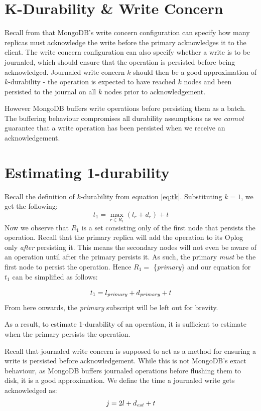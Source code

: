 \section{K-Durability \& Write Concern}
Recall from  that MongoDB's write concern configuration can specify how many replicas must acknowledge the write before the primary acknowledges it to the client. The write concern configuration can also specify whether a write is to be journaled, which should ensure that the operation is persisted before being acknowledged. Journaled write concern $k$ should then be a good approximation of $k$-durability - the operation is expected to have reached $k$ nodes and been persisted to the journal on all $k$ nodes prior to acknowledgement. 

However MongoDB buffers write operations before persisting them as a batch. The buffering behaviour compromises all durability assumptions as we \textit{cannot} guarantee that a write operation has been persisted when we receive an acknowledgement. 

\section{Estimating 1-durability}
Recall the definition of $k$-durability from equation \ref{eq:tk}. Substituting $k = 1$, we get the following:
\[
    t_1 = \max_{r \in R_1}(l_r + d_r) + t
\]
Now we observe that $R_1$ is a set consisting only of the first node that persists the operation. Recall that the primary replica will add the operation to its Oplog only \textit{after} persisting it. This means the secondary nodes will not even be aware of an operation until after the primary persists it. As such, the primary \textit{must} be the first node to persist the operation. Hence $R_1 = $ \{\textit{primary}\} and our equation for $t_1$ can be simplified as follows:
\begin{center}
\begin{equation} \label{eq:t1}
    t_1 = l_{\text{\textit{primary}}}+ d_{\text{\textit{primary}}} + t
\end{equation}
From here onwards, the \textit{primary} subscript will be left out for brevity.
\end{center}

As a result, to estimate 1-durability of an operation, it is sufficient to estimate when the primary persists the operation.

Recall that journaled write concern is supposed to act as a method for ensuring a write is persisted before acknowledgement. While this is not MongoDB's exact behaviour, as MongoDB buffers journaled operations before flushing them to disk, it is a good approximation. We define the time a journaled write gets acknowledged as:
\[
    j = 2l + d_{\text{\textit{est}}} + t
\]

